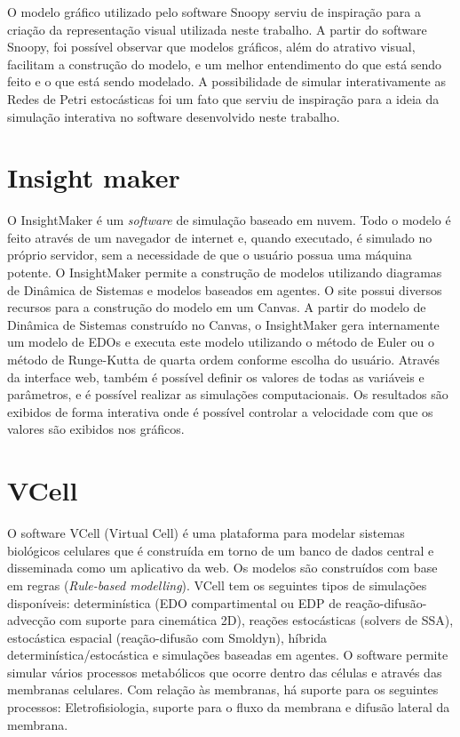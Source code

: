 \documentclass[
	12pt,				%
	openright,			%
	oneside,			%
	a4paper,			%
	main=brazil,
	english,			%
	]{ufsj-abntex2}
\begin{document}
O modelo gráfico utilizado pelo software Snoopy serviu de inspiração para a criação da representação visual utilizada neste trabalho. A partir do software Snoopy, foi possível observar que modelos gráficos, além do atrativo visual, facilitam a construção do modelo, e um melhor entendimento do que está sendo feito e o que está sendo modelado. A possibilidade de simular interativamente as Redes de Petri estocásticas foi um fato que serviu de inspiração para a ideia da simulação interativa no software desenvolvido neste trabalho. 

\section{Insight maker}
    
O InsightMaker \cite{insightmaker} é um \textit{software} de simulação baseado em nuvem. Todo o modelo é feito através de um navegador de internet e, quando executado, é simulado no próprio servidor, sem a necessidade de que o usuário possua uma máquina potente. O InsightMaker \cite{insightmaker} permite a construção de modelos utilizando diagramas de Dinâmica de Sistemas e modelos baseados em agentes. O site possui diversos recursos para a construção do modelo em um Canvas. A partir do modelo de Dinâmica de Sistemas construído no Canvas, o InsightMaker \cite{insightmaker} gera internamente um modelo de EDOs e executa este modelo utilizando o método de Euler ou o método de Runge-Kutta de quarta ordem conforme escolha do usuário. Através da interface web, também é possível definir os valores de todas as variáveis e parâmetros, e é possível realizar as simulações computacionais. Os resultados são exibidos de forma interativa onde é possível controlar a velocidade com que os valores são exibidos nos gráficos. 

\section{VCell}

O software VCell (Virtual Cell) \cite{vcell,VCellref1} é uma plataforma para modelar sistemas biológicos celulares que é construída em torno de um banco de dados central e disseminada como um aplicativo da web. Os modelos são construídos com base em regras (\textit{Rule-based modelling}). VCell tem os seguintes tipos de simulações disponíveis: determinística (EDO compartimental ou EDP de reação-difusão-advecção com suporte para cinemática 2D), reações estocásticas (solvers de SSA), estocástica espacial (reação-difusão com Smoldyn), híbrida determinística/estocástica e simulações baseadas em agentes. O software permite simular vários processos metabólicos que ocorre dentro das células e através das membranas celulares. Com relação às membranas, há suporte para os seguintes processos: Eletrofisiologia, suporte para o fluxo da membrana e difusão lateral da membrana. 
\end{document}
